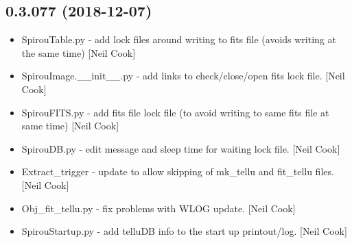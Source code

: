 \documentclass[a4paper,10pt,english]{report}
\begin{document}
\subsection{0.3.077 (2018-12-07)}
\label{\detokenize{misc/changelog:id244}}\begin{itemize}
\item {} 
SpirouTable.py - add lock files around writing to fits file (avoids
writing at the same time) {[}Neil Cook{]}

\item {} 
SpirouImage.\_\_init\_\_.py - add links to check/close/open fits lock
file. {[}Neil Cook{]}

\item {} 
SpirouFITS.py - add fits file lock file (to avoid writing to same fits
file at same time) {[}Neil Cook{]}

\item {} 
SpirouDB.py - edit message and sleep time for waiting lock file. {[}Neil
Cook{]}

\item {} 
Extract\_trigger - update to allow skipping of mk\_tellu and fit\_tellu
files. {[}Neil Cook{]}

\item {} 
Obj\_fit\_tellu.py - fix problems with WLOG update. {[}Neil Cook{]}

\item {} 
SpirouStartup.py - add telluDB info to the start up printout/log.
{[}Neil Cook{]}

\end{itemize}
\end{document}
